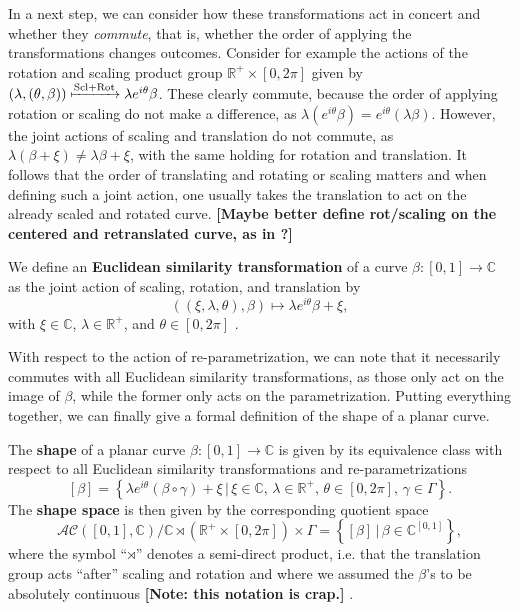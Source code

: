 In a next step, we can consider how these transformations act in concert and whether they \textit{commute}, that is, whether the order of applying the transformations changes outcomes.
Consider for example the actions of the rotation and scaling product group $\mathbb{R}^+ \times [0,2\pi]$ given by $(\lambda, (\theta, \beta)) \xmapsto{\text{Scl} + \text{Rot}} \lambda e^{i\theta} \beta$.
These clearly commute, because the order of applying rotation or scaling do not make a difference, as $\lambda(e^{i\theta}\beta) = e^{i\theta}(\lambda\beta)$.
However, the joint actions of scaling and translation do not commute, as $\lambda(\beta + \xi) \neq \lambda\beta + \xi$, with the same holding for rotation and translation.
It follows that the order of translating and rotating or scaling matters and when defining such a joint action, one usually takes the translation to act on the already scaled and rotated curve.
\textbf{[Maybe better define rot/scaling on the centered and retranslated curve, as in \cite{Stoecker2021}?]}
\begin{definition} 
  We define an \textbf{Euclidean similarity transformation} of a curve $\beta :
  [0,1] \rightarrow \mathbb{C}$ as the joint action of scaling, rotation, and
  translation by 
  $$((\xi, \lambda, \theta), \beta) \mapsto \lambda e^{i\theta} \beta + \xi,$$
  with $\xi \in \mathbb{C}$, $\lambda \in \mathbb{R}^+$, and $\theta \in
  [0,2\pi]$ \parencite[see][62]{DrydenMardia2016}.
\end{definition}
\noindent With respect to the action of re-parametrization, we can note that it
necessarily commutes with all Euclidean similarity transformations, as those
only act on the image of $\beta$, while the former only acts on the
parametrization.
Putting everything together, we can finally give a formal definition of the
shape of a planar curve.
\begin{definition}[Shape]
  The \textbf{shape} of a planar curve $\beta : [0,1] \rightarrow \mathbb{C}$
  is given by its equivalence class with respect to all Euclidean similarity
  transformations and re-parametrizations
  $$ [\beta] = \left\{\lambda e^{i\theta}(\beta \circ \gamma) + \xi\,|\, \xi
  \in \mathbb{C},\, \lambda \in \mathbb{R}^+,\, \theta \in [0,2\pi],\, \gamma
  \in \Gamma\right\}. $$
  The \textbf{shape space} is then given by the corresponding quotient space 
  $$\mathcal{AC}([0,1], \mathbb{C}) \big/ \mathbb{C} \rtimes \left( \mathbb{R}^+ \times
  [0,2\pi] \right) \times \Gamma = \left\{[\beta]\,|\,\beta \in
  \mathbb{C}^{[0,1]}\right\},$$
  where the symbol \enquote{$\rtimes$} denotes a semi-direct product, i.e. that
  the translation group acts \enquote{after} scaling and rotation and where we assumed the $\beta$'s to be absolutely continuous \textbf{[Note: this notation is crap.]}
  \parencite[for details see][Chapter 3]{SrivastavaKlassen2016}.
\end{definition}

